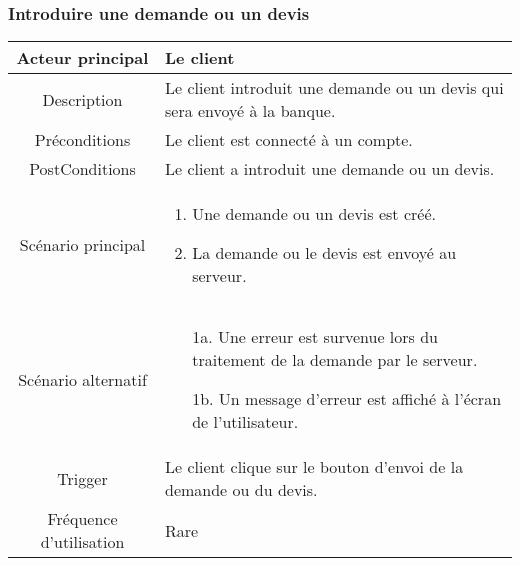 \documentclass{article}
\begin{document}
\subsubsection{Introduire une demande ou un devis}
\begin{table}[h]
    \begin{tabular}{|c|p{10cm}|}
       \hline
       Acteur principal&Le client\\
       \hline
       Description&Le client introduit une demande ou un devis qui sera envoyé à la banque.\\
       \hline
       Préconditions&Le client est connecté à un compte.\\
       \hline
       PostConditions&Le client a introduit une demande ou un devis.\\
       \hline
       Scénario principal& 
             \begin{enumerate}
                \item Une demande ou un devis est créé.
                \item La demande ou le devis est envoyé au serveur.
             \end{enumerate}     \\
       \hline
       Scénario alternatif& 
       \begin{itemize}
        \item[1a.] Une erreur est survenue lors du traitement de la demande par le serveur.
        \item[1b.] Un message d'erreur est affiché à l'écran de l'utilisateur. 
    \end{itemize}
       \\
       \hline
       Trigger&Le client clique sur le bouton d'envoi de la demande ou du devis.\\
       \hline
       Fréquence d'utilisation&Rare\\
       \hline
    \end{tabular}
 \end{table}

\newpage

\end{document}
